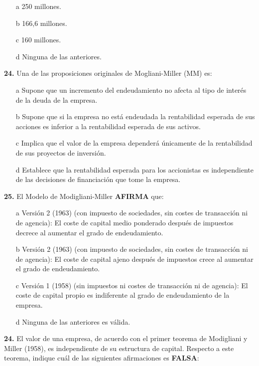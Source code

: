 \documentclass{nuevotema}
\begin{document}
\begin{enumerate}
	\item[a] 250 millones.
	\item[b] 166,6 millones.
	\item[c] 160 millones.
	\item[d] Ninguna de las anteriores.
\end{enumerate}

\textbf{24.} Una de las proposiciones originales de Mogliani-Miller (MM) es:

\begin{enumerate}
	\item[a] Supone que un incremento del endeudamiento no afecta al tipo de interés de la deuda de la empresa.
	\item[b] Supone que si la empresa no está endeudada la rentabilidad esperada de sus acciones es inferior a la rentabilidad esperada de sus activos.
	\item[c] Implica que el valor de la empresa dependerá únicamente de la rentabilidad de sus proyectos de inversión.
	\item[d] Establece que la rentabilidad esperada para los accionistas es independiente de las decisiones de financiación que tome la empresa.
\end{enumerate}

\textbf{25.} El Modelo de Modigliani-Miller \textbf{AFIRMA} que:

\begin{enumerate}
	\item[a] Versión 2 (1963) (con impuesto de sociedades, sin costes de transacción ni de agencia): El coste de capital medio ponderado después de impuestos decrece al aumentar el grado de endeudamiento.
	\item[b] Versión 2 (1963) (con impuesto de sociedades, sin costes de transacción ni de agencia): El coste de capital ajeno después de impuestos crece al aumentar el grado de endeudamiento.
	\item[c] Versión 1 (1958) (sin impuestos ni costes de transacción ni de agencia): El coste de capital propio es indiferente al grado de endeudamiento de la empresa.
	\item[d] Ninguna de las anteriores es válida. 
\end{enumerate}



\textbf{24.} El valor de una empresa, de acuerdo con el primer teorema de Modigliani y Miller (1958), es independiente de su estructura de capital. Respecto a este teorema, indique cuál de las siguientes afirmaciones es \textbf{FALSA}:
\end{document}
